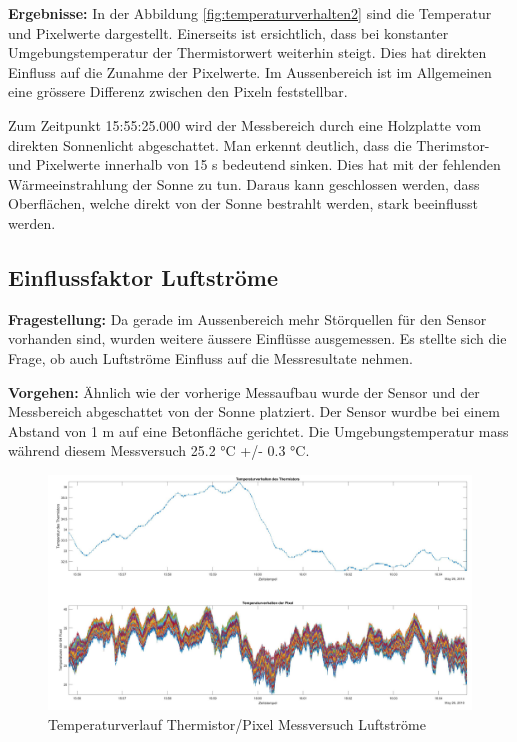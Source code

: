 \textbf{Ergebnisse:} In der Abbildung \ref{fig:temperaturverhalten2} sind die Temperatur und Pixelwerte dargestellt. Einerseits ist ersichtlich, dass bei konstanter Umgebungstemperatur der Thermistorwert weiterhin steigt. Dies hat direkten Einfluss auf die Zunahme der Pixelwerte. Im Aussenbereich ist im Allgemeinen eine grössere Differenz zwischen den Pixeln feststellbar.

Zum Zeitpunkt 15:55:25.000 wird der Messbereich durch eine Holzplatte vom direkten Sonnenlicht abgeschattet. Man erkennt deutlich, dass die Therimstor- und Pixelwerte innerhalb von 15 s bedeutend sinken. Dies hat mit der fehlenden Wärmeeinstrahlung der Sonne zu tun. Daraus kann geschlossen werden, dass Oberflächen, welche direkt von der Sonne bestrahlt werden, stark beeinflusst werden.

\subsection{Einflussfaktor Luftströme}
\textbf{Fragestellung:} Da gerade im Aussenbereich mehr Störquellen für den Sensor vorhanden sind, wurden weitere äussere Einflüsse ausgemessen. Es stellte sich die Frage, ob auch Luftströme Einfluss auf die Messresultate nehmen.

\textbf{Vorgehen:} Ähnlich wie der vorherige Messaufbau wurde der Sensor und der Messbereich abgeschattet von der Sonne platziert. Der Sensor wurdbe bei einem Abstand von 1 m auf eine Betonfläche gerichtet. Die Umgebungstemperatur mass während diesem Messversuch 25.2 °C +/- 0.3 °C.  
	
\begin{figure}[H]
	\centering
	\includegraphics[width=1.0\textwidth]{fig/Temperaturverhaltenwind}
	\caption{Temperaturverlauf Thermistor/Pixel Messversuch Luftströme}
	\label{fig:temperaturverhaltenwind}
\end{figure}

